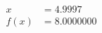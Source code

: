 \documentclass[preview]{standalone}
\begin{document}
\begin{align*}
x &= 4.9997\\f(x) &= 8.0000000
\end{align*}
\end{document}
